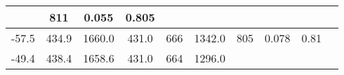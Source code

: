 \documentclass[a4paper,10pt]{article}
\begin{document}
\begin{longtable}{
     |
%    
    c|
%    
    c|
%    
    c|
%    
    c|
%    
    c|
%    
    c|
%    
    c|
%    
    c|
%    
    c|
%    
    c|
%    
    }
%        
        & 811
%        

%        

%        
        & 0.055
%        

%        

%        
        & 0.805
%        

%        
        \\
        \hline

        

%        

%        
        -57.5
%        

%        

%        
        & 434.9
%        

%        

%        
        & 1660.0
%        

%        

%        
        & 431.0
%        

%        

%        
        & 666
%        

%        

%        
        & 1342.0
%        

%        

%        
        & 805
%        

%        

%        
        & 0.078
%        

%        

%        
        & 0.81
%        

%        
        \\
        \hline

        

%        

%        
        -49.4
%        

%        

%        
        & 438.4
%        

%        

%        
        & 1658.6
%        

%        

%        
        & 431.0
%        

%        

%        
        & 664
%        

%        

%        
        & 1296.0
%        

%        


\end{longtable}
\end{document}
